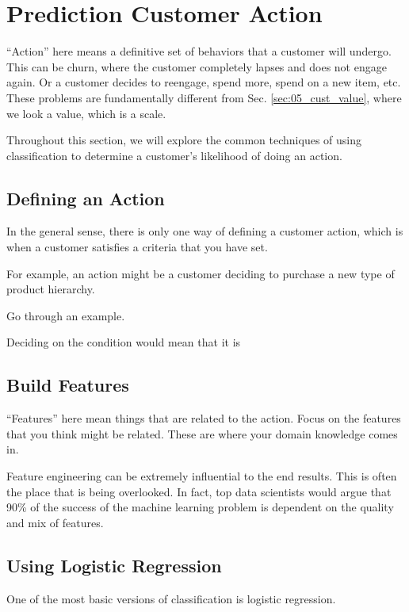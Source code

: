 \section{Prediction Customer Action}

``Action'' here means a definitive set of behaviors that a customer will undergo.  This can be churn, where the customer completely lapses and does not engage again.  Or a customer decides to reengage, spend more, spend on a new item, etc.  These problems are fundamentally different from Sec. \ref{sec:05_cust_value}, where we look a value, which is a scale.  

Throughout this section, we will explore the common techniques of using classification to determine a customer's likelihood of doing an action.  

\subsection{Defining an Action}

In the general sense, there is only one way of defining a customer action, which is when a customer satisfies a criteria that you have set.  

For example, an action might be a customer deciding to purchase a new type of product hierarchy.  

Go through an example.  

Deciding on the condition would mean that it is 

\subsection{Build Features}

``Features'' here mean things that are related to the action.  Focus on the features that you think might be related.  These are where your domain knowledge comes in.  

Feature engineering can be extremely influential to the end results.  This is often the place that is being overlooked.  In fact, top data scientists would argue that 90\% of the success of the machine learning problem is dependent on the quality and mix of features.  

\subsection{Using Logistic Regression}

One of the most basic versions of classification is logistic regression.  



\newpage 